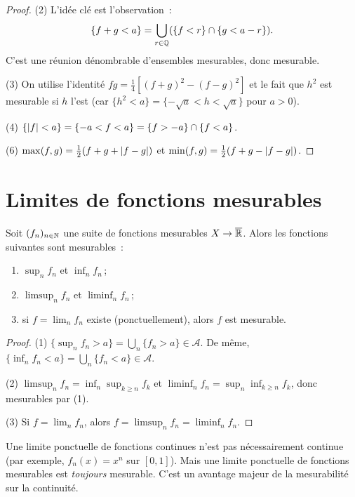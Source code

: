 \begin{proof}
(2) L'id\'ee cl\'e est l'observation~:
\[
\{f + g < a\} = \bigcup_{r \in \mathbb{Q}} (\{f < r\} \cap \{g < a - r\}).
\]
C'est une r\'eunion d\'enombrable d'ensembles mesurables, donc mesurable.

(3) On utilise l'identit\'e $fg = \frac{1}{4}[(f+g)^2 - (f-g)^2]$ et le fait que
$h^2$ est mesurable si $h$ l'est (car $\{h^2 < a\} = \{-\sqrt{a} < h < \sqrt{a}\}$
pour $a > 0$).

(4) $\{\left| f \right| < a\} = \{-a < f < a\} = \{f > -a\} \cap \{f < a\}$.

(6) $\max(f, g) = \frac{1}{2}(f + g + \left| f - g \right|)$ et
$\min(f, g) = \frac{1}{2}(f + g - \left| f - g \right|)$.
\end{proof}

\section{Limites de fonctions mesurables}

\begin{theoreme}
\label{thm:stabilite_limite}
Soit $(f_n)_{n \in \mathbb{N}}$ une suite de fonctions mesurables $X \to \overline{\mathbb{R}}$.
Alors les fonctions suivantes sont mesurables~:
\begin{enumerate}
    \item $\sup_n f_n$ et $\inf_n f_n$\,;
    \item $\limsup_n f_n$ et $\liminf_n f_n$\,;
    \item si $f = \lim_n f_n$ existe (ponctuellement), alors $f$ est mesurable.
\end{enumerate}
\end{theoreme}

\begin{proof}
(1) $\{\sup_n f_n > a\} = \bigcup_n \{f_n > a\} \in \mathcal{A}$.
De m\^eme, $\{\inf_n f_n < a\} = \bigcup_n \{f_n < a\} \in \mathcal{A}$.

(2) $\limsup_n f_n = \inf_n \sup_{k \geq n} f_k$ et
$\liminf_n f_n = \sup_n \inf_{k \geq n} f_k$, donc mesurables par (1).

(3) Si $f = \lim_n f_n$, alors $f = \limsup_n f_n = \liminf_n f_n$.
\end{proof}

\begin{attention}[title=\textbf{Contraste avec la continuit\'e}]
Une limite ponctuelle de fonctions continues n'est pas n\'ecessairement continue
(par exemple, $f_n(x) = x^n$ sur $[0,1]$). Mais une limite ponctuelle de fonctions
mesurables est \emph{toujours} mesurable. C'est un avantage majeur de la
mesurabilit\'e sur la continuit\'e.
\end{attention}

